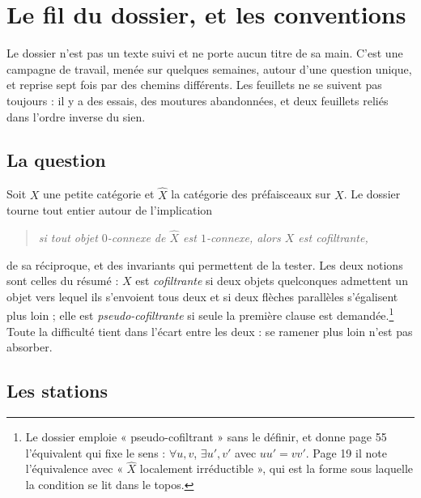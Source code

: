 \documentclass[11pt,a4paper]{article}
\begin{document}
\section*{Le fil du dossier, et les conventions}

Le dossier n'est pas un texte suivi et ne porte aucun titre de sa main. C'est
une campagne de travail, menée sur quelques semaines, autour d'une question
unique, et reprise sept fois par des chemins différents. Les feuillets ne se
suivent pas toujours : il y a des essais, des moutures abandonnées, et deux
feuillets reliés dans l'ordre inverse du sien.

\subsection*{La question}

Soit $X$ une petite catégorie et $\widehat{X}$ la catégorie des préfaisceaux
sur $X$. Le dossier tourne tout entier autour de l'implication

\begin{quote}
\emph{si tout objet $0$-connexe de $\widehat{X}$ est $1$-connexe, alors $X$
est cofiltrante,}
\end{quote}

de sa réciproque, et des invariants qui permettent de la tester. Les deux
notions sont celles du résumé : $X$ est \emph{cofiltrante} si deux objets
quelconques admettent un objet vers lequel ils s'envoient tous deux et si deux
flèches parallèles s'égalisent plus loin ; elle est \emph{pseudo-cofiltrante}
si seule la première clause est demandée.\footnote{Le dossier emploie
« pseudo-cofiltrant » sans le définir, et donne page 55 l'équivalent qui fixe
le sens : $\forall u, v$, $\exists u', v'$ avec $uu' = vv'$. Page 19 il note
l'équivalence avec « $\widehat{X}$ localement irréductible », qui est la
forme sous laquelle la condition se lit dans le topos.} Toute la difficulté
tient dans l'écart entre les deux : se ramener plus loin n'est pas absorber.

\subsection*{Les stations}
\end{document}
